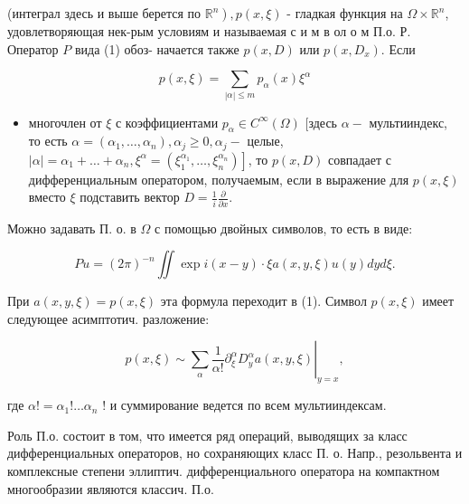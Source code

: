\documentclass[10pt]{article}
\begin{document}
(интеграл здесь и выше берется по $\left.\mathbb{R}^{n}\right), p(x, \xi)$ - гладкая функция на $\Omega \times \mathbb{R}^{n}$, удовлетворяющая нек-рым условиям и называемая с и м в ол о м П.о. Р. Оператор $P$ вида (1) обоз- начается также $p(x, D)$ или $p\left(x, D_{x}\right)$. Если



\[

p(x, \xi)=\sum_{|\alpha| \leqslant m} p_{\alpha}(x) \xi^{\alpha}

\]



\begin{itemize}

  \item многочлен от $\xi$ с коэффициентами $p_{\alpha} \in C^{\infty}(\Omega)$ [здесь $\alpha-$ мультииндекс, то есть $\alpha=\left(\alpha_{1}, \ldots, \alpha_{n}\right), \alpha_{j} \geqslant 0, \alpha_{j}-$ целые, $\left.|\alpha|=\alpha_{1}+\ldots+\alpha_{n}, \xi^{\alpha}=\left(\xi_{1}^{\alpha_{1}}, \ldots, \xi_{n}^{\alpha_{n}}\right)\right]$, то $p(x, D)$ совпадает с дифференциальным оператором, получаемым, если в выражение для $p(x, \xi)$ вместо $\xi$ подставить вектор $D=\frac{1}{i} \frac{\partial}{\partial x}$.

\end{itemize}



Можно задавать П. о. в $\Omega$ с помощью двойных символов, то есть в виде:



\[

P u=(2 \pi)^{-n} \iint \exp i(x-y) \cdot \xi a(x, y, \xi) u(y) d y d \xi .

\]



При $a(x, y, \xi)=p(x, \xi)$ эта формула переходит в (1). Символ $p(x, \xi)$ имеет следующее асимптотич. разложение:



\[

\left.p(x, \xi) \sim \sum_{\alpha} \frac{1}{\alpha !} \partial_{\xi}^{\alpha} D_{y}^{\alpha} a(x, y, \xi)\right|_{y=x},

\]



где $\alpha !=\alpha_{1} ! \ldots \alpha_{n}$ ! и суммирование ведется по всем мультииндексам.



Роль П.о. состоит в том, что имеется ряд операций, выводящих за класс дифференциальных операторов, но сохраняющих класс П. о. Напр., резольвента и комплексные степени эллиптич. дифференциального оператора на компактном многообразии являются классич. П.о.
\end{document}
